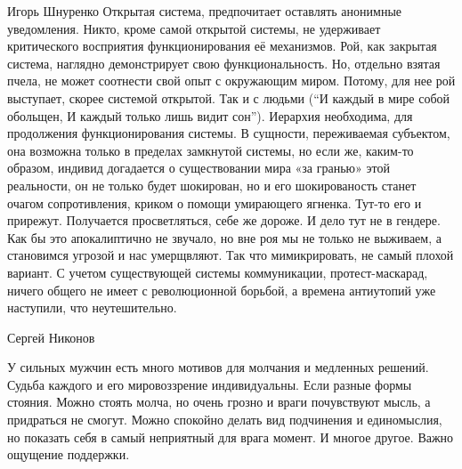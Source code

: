 Игорь Шнуренко Открытая система, предпочитает оставлять анонимные уведомления.
Никто, кроме самой открытой системы, не удерживает критического восприятия
функционирования её механизмов. Рой, как закрытая система, наглядно
демонстрирует свою функциональность. Но, отдельно взятая пчела, не может
соотнести свой опыт с окружающим миром. Потому, для нее рой выступает, скорее
системой открытой. Так и с людьми (\enquote{И каждый в мире собой обольщен, И каждый
только лишь видит сон}). Иерархия необходима, для продолжения функционирования
системы. В сущности, переживаемая субъектом, она возможна только в пределах
замкнутой системы, но если же, каким-то образом, индивид догадается о
существовании мира «за гранью» этой реальности, он не только будет шокирован,
но и его шокированость станет очагом сопротивления, криком о помощи умирающего
ягненка. Тут-то его и прирежут. Получается просветляться, себе же дороже. И
дело тут не в гендере. Как бы это апокалиптично не звучало, но вне роя мы не
только не выживаем, а становимся угрозой и нас умерщвляют. Так что
мимикрировать, не самый плохой вариант. С учетом существующей системы
коммуникации, протест-маскарад, ничего общего не имеет с революционной борьбой,
а времена антиутопий уже наступили, что неутешительно.

Сергей Никонов

У сильных мужчин есть много мотивов для молчания и медленных решений. Судьба
каждого и его мировоззрение индивидуальны. Если разные формы стояния. Можно
стоять молча, но очень грозно и враги почувствуют мысль, а придраться не
смогут. Можно спокойно делать вид подчинения и единомыслия, но показать себя в
самый неприятный для врага момент. И многое другое. Важно ощущение поддержки.
